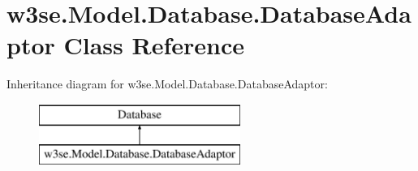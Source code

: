 \hypertarget{classw3se_1_1_model_1_1_database_1_1_database_adaptor}{\section{w3se.\-Model.\-Database.\-Database\-Adaptor Class Reference}
\label{classw3se_1_1_model_1_1_database_1_1_database_adaptor}
}
Inheritance diagram for w3se.\-Model.\-Database.\-Database\-Adaptor\-:\begin{figure}[H]
\begin{center}
\leavevmode
\includegraphics[height=2.000000cm]{classw3se_1_1_model_1_1_database_1_1_database_adaptor}
\end{center}
\end{figure}
